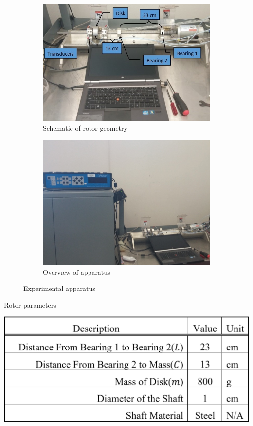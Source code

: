 		\begin{figure}[H]
			\begin{subfigure}[b]{.5\textwidth}
				\centering
				\includegraphics[width=.95\linewidth]{./figures/Images/Figure_3.jpg}
				\caption{Schematic of rotor geometry}
				\label{fig:Figure_3a}
				\centering
			\end{subfigure} %
			\begin{subfigure}[b]{.5\textwidth}
				\centering
				\includegraphics[width=.95\linewidth]{./figures/Images/Figure_3b.jpg}
				\caption{Overview of apparatus}
				\label{fig:Figure_3b}
				\centering
			\end{subfigure}
			\caption{Experimental apparatus}
			\label{fig:Figure_3}
		\end{figure}
		\begin{table}[H]
			\centering
			\caption{Rotor parameters}
			\includegraphics[scale=.25]{./figures/Images/Table_1.png}
			\label{tab:Table_1}
			\centering
		\end{table}
